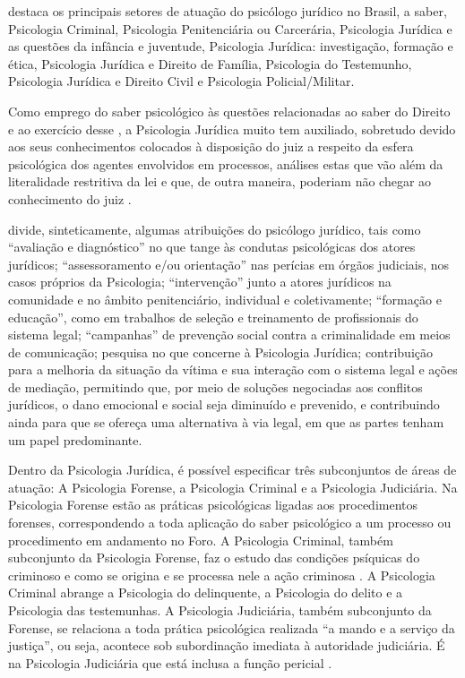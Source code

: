  destaca os principais setores de atuação do psicólogo jurídico no Brasil, a saber, Psicologia Criminal, Psicologia Penitenciária ou Carcerária, Psicologia Jurídica e as questões da infância e juventude, Psicologia Jurídica: investigação, formação e ética, Psicologia Jurídica e Direito de Família, Psicologia do Testemunho, Psicologia Jurídica e Direito Civil e Psicologia Policial/Militar. 

Como emprego do saber psicológico às questões relacionadas ao saber do Direito e ao exercício desse \cite{LEAL2008}, a Psicologia Jurídica muito tem auxiliado, sobretudo devido aos seus conhecimentos colocados à disposição do juiz a respeito da esfera psicológica dos agentes envolvidos em processos, análises estas que vão além da literalidade restritiva da lei e que, de outra maneira, poderiam não chegar ao conhecimento do juiz .

 divide, sinteticamente, algumas atribuições do psicólogo jurídico, tais como ``avaliação e diagnóstico'' no que tange às condutas psicológicas dos atores jurídicos; ``assessoramento e/ou orientação'' nas perícias em órgãos judiciais, nos casos próprios da Psicologia; ``intervenção'' junto a atores jurídicos na comunidade e no âmbito penitenciário, individual e coletivamente; ``formação e educação'', como em trabalhos de seleção e treinamento de profissionais do sistema legal; ``campanhas'' de prevenção social contra a criminalidade em meios de comunicação; pesquisa no que concerne à Psicologia Jurídica; contribuição para a melhoria da situação da vítima e sua interação com o sistema legal e ações de mediação, permitindo que, por meio de soluções negociadas aos conflitos jurídicos, o dano emocional e social seja diminuído e prevenido, e contribuindo ainda para que  se ofereça uma alternativa à via legal, em que as partes tenham um papel predominante.

Dentro da Psicologia Jurídica, é possível especificar três subconjuntos de áreas de atuação: A Psicologia Forense, a Psicologia Criminal e a Psicologia Judiciária. Na Psicologia Forense estão  as práticas psicológicas ligadas aos procedimentos forenses, correspondendo a toda aplicação do saber psicológico a um processo ou procedimento em andamento no Foro. A Psicologia Criminal, também subconjunto da Psicologia Forense, faz o estudo das condições psíquicas do criminoso e como se origina e se processa nele a ação criminosa . A Psicologia Criminal abrange a Psicologia do delinquente, a Psicologia do delito e a Psicologia das testemunhas. A Psicologia Judiciária, também subconjunto da Forense, se relaciona a toda prática psicológica realizada ``a mando e a serviço da justiça'', ou seja, acontece sob subordinação imediata à autoridade judiciária. É na Psicologia Judiciária que está inclusa a função pericial \cite{LEAL2008}.

